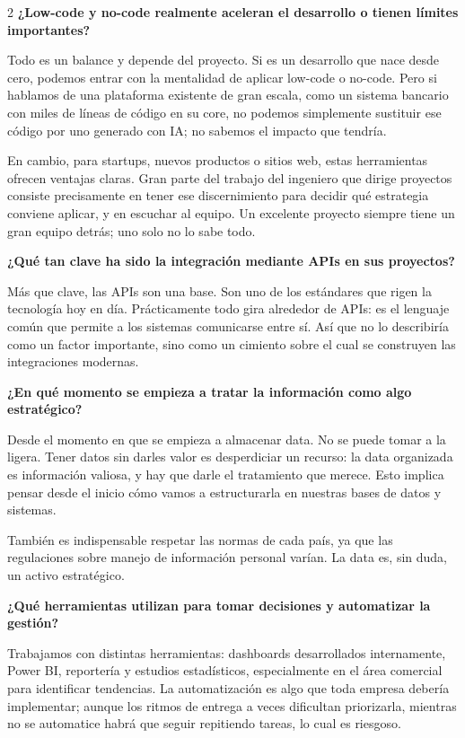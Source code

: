 \documentclass[10pt,spanish,Letterpaper,openany]{book}
\let\origtextbf\textbf
\renewcommand{\textbf}[1]{{\color{textlinetitle}\origtextbf{#1}}}
\begin{document}
\begin {multicols}{2}
\textbf{¿Low-code y no-code realmente aceleran el desarrollo o tienen límites importantes?}

Todo es un balance y depende del proyecto. Si es un desarrollo que nace desde cero, podemos entrar con la mentalidad de aplicar low-code o no-code. Pero si hablamos de una plataforma existente de gran escala, como un sistema bancario con miles de líneas de código en su core, no podemos simplemente sustituir ese código por uno generado con IA; no sabemos el impacto que tendría.

En cambio, para startups, nuevos productos o sitios web, estas herramientas ofrecen ventajas claras. Gran parte del trabajo del ingeniero que dirige proyectos consiste precisamente en tener ese discernimiento para decidir qué estrategia conviene aplicar, y en escuchar al equipo. Un excelente proyecto siempre tiene un gran equipo detrás; uno solo no lo sabe todo.

\textbf{¿Qué tan clave ha sido la integración mediante APIs en sus proyectos?}

Más que clave, las APIs son una base. Son uno de los estándares que rigen la tecnología hoy en día. Prácticamente todo gira alrededor de APIs: es el lenguaje común que permite a los sistemas comunicarse entre sí. Así que no lo describiría como un factor importante, sino como un cimiento sobre el cual se construyen las integraciones modernas.

\textbf{¿En qué momento se empieza a tratar la información como algo estratégico?}

Desde el momento en que se empieza a almacenar data. No se puede tomar a la ligera. Tener datos sin darles valor es desperdiciar un recurso: la data organizada es información valiosa, y hay que darle el tratamiento que merece. Esto implica pensar desde el inicio cómo vamos a estructurarla en nuestras bases de datos y sistemas.

También es indispensable respetar las normas de cada país, ya que las regulaciones sobre manejo de información personal varían. La data es, sin duda, un activo estratégico.

\textbf{¿Qué herramientas utilizan para tomar decisiones y automatizar la gestión?}

Trabajamos con distintas herramientas: dashboards desarrollados internamente, Power BI, reportería y estudios estadísticos, especialmente en el área comercial para identificar tendencias. La automatización es algo que toda empresa debería implementar; aunque los ritmos de entrega a veces dificultan priorizarla, mientras no se automatice habrá que seguir repitiendo tareas, lo cual es riesgoso.


\end{multicols}
\end{document}
